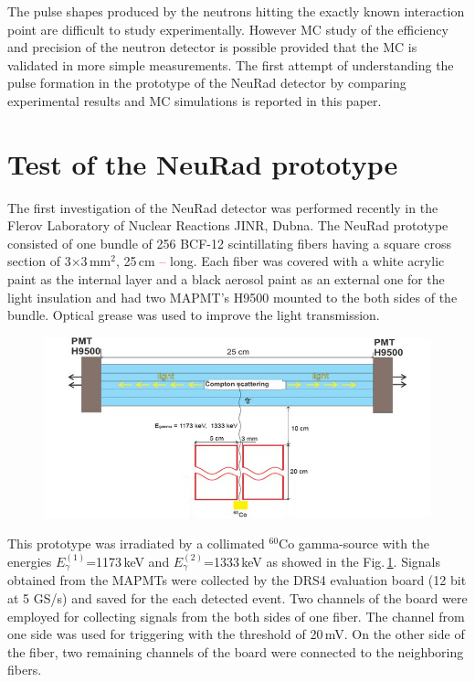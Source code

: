 \documentclass{webofc}
\newcommand{\red}[1]{\textcolor{red}{#1}}
\begin{document}
The pulse shapes produced by the neutrons hitting the exactly known interaction point are difficult to study experimentally. However MC study of the efficiency and precision of the neutron detector is possible provided that the MC is validated in more simple measurements.
The first attempt of understanding the pulse formation in the prototype of the NeuRad  detector by comparing experimental results and MC simulations is reported in this paper. 

\section{Test of the NeuRad prototype}

The first investigation of the NeuRad detector was performed recently in the Flerov Laboratory of Nuclear Reactions JINR, Dubna.
The NeuRad prototype consisted of one bundle of 256 BCF-12 \cite{crystals} scintillating fibers having a square cross section of 3$\times$3\,mm$^2$, 25\,cm \red{--} long.
Each fiber was covered with a white acrylic paint as the internal layer and a black aerosol paint as an external one for the light insulation and had two MAPMT's H9500 \cite{hm} mounted to the both sides of the bundle. Optical grease was used to improve the light transmission.

\begin{figure}[h]
	\centering
	\includegraphics[width=0.7\linewidth]{NeuRadexperiment.png}
\label{ris:neuradexp}
\end{figure}

This prototype was irradiated by a collimated $^{60}$Co gamma-source with the energies $E^{(1)}_{\gamma}$=1173\,keV and $E^{(2)}_{\gamma}$=1333\,keV as showed in the Fig.\,\ref{ris:neuradexp}. Signals obtained from the MAPMTs were collected by the DRS4 evaluation board \cite{DRS} (12 bit at 5 GS/s) and saved for the each detected event.
Two channels of the board were employed for collecting signals from the both sides of one fiber. 
The channel from one side was used for triggering with the threshold of 20\,mV.
On the other side of the fiber, two remaining channels of the board were connected to the neighboring fibers.
\end{document}
